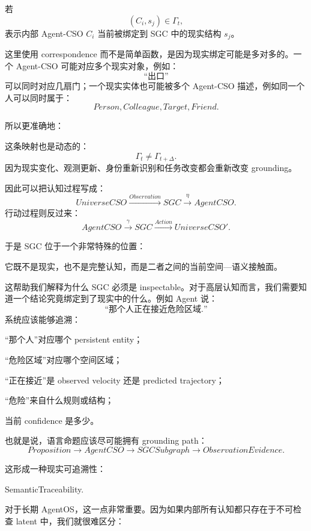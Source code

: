 若
\[
(C_i,s_j)\in\Gamma_t,
\]
表示内部 Agent-CSO \(C_i\) 当前被绑定到 SGC 中的现实结构 \(s_j\)。

这里使用 correspondence 而不是简单函数，是因为现实绑定可能是多对多的。一个 Agent-CSO 可能对应多个现实对象，例如：
\[
\text{``出口''}
\]
可以同时对应几扇门；一个现实实体也可能被多个 Agent-CSO 描述，例如同一个人可以同时属于：
\[
Person,
Colleague,
Target,
Friend.
\]

所以更准确地：
\begin{statementbox}
\centering
{}
\end{statementbox}

这条映射也是动态的：
\[
\Gamma_t
\neq
\Gamma_{t+\Delta}.
\]
因为现实变化、观测更新、身份重新识别和任务改变都会重新改变 grounding。

因此可以把认知过程写成：
\[
UniverseCSO
\xrightarrow{Observation}
SGC
\xrightarrow{\eta}
AgentCSO.
\]
行动过程则反过来：
\[
AgentCSO
\xrightarrow{\gamma}
SGC
\xrightarrow{Action}
UniverseCSO'.
\]

于是 SGC 位于一个非常特殊的位置：
\begin{statementbox}
\centering
{}
\end{statementbox}

它既不是现实，也不是完整认知，而是二者之间的当前空间—语义接触面。

这帮助我们解释为什么 SGC 必须是 inspectable。对于高层认知而言，我们需要知道一个结论究竟绑定到了现实中的什么。例如 Agent 说：
\[
\text{``那个人正在接近危险区域.''}
\]
系统应该能够追溯：

“那个人”对应哪个 persistent entity；

“危险区域”对应哪个空间区域；

“正在接近”是 observed velocity 还是 predicted trajectory；

“危险”来自什么规则或结构；

当前 confidence 是多少。

也就是说，语言命题应该尽可能拥有 grounding path：
\[
Proposition
\rightarrow
AgentCSO
\rightarrow
SGCSubgraph
\rightarrow
ObservationEvidence.
\]

这形成一种现实可追溯性：
\begin{statementbox}
SemanticTraceability.
\end{statementbox}

对于长期 AgentOS，这一点非常重要。因为如果内部所有认知都只存在于不可检查 latent 中，我们就很难区分：

